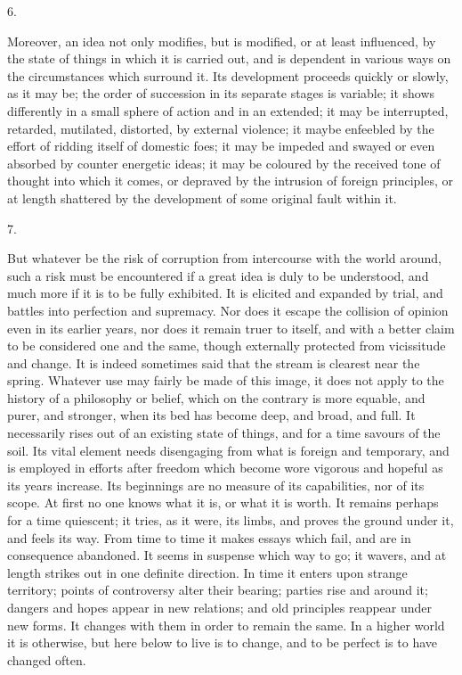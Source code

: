 6.

Moreover, an idea not only modifies, but is modified,
or at least influenced, by the state of things in which
it is carried out, and is dependent in various ways on
the circumstances which surround it. Its development
proceeds quickly or slowly, as it may be; the order of
succession in its separate stages is variable; it shows
differently in a small sphere of action and in an
extended; it may be interrupted, retarded, mutilated,
distorted, by external violence; it maybe enfeebled by
the effort of ridding itself of domestic foes; it may be
impeded and swayed or even absorbed by counter energetic
ideas; it may be coloured by the received tone of thought
into which it comes, or depraved by the intrusion of
foreign principles, or at length shattered by the
development of some original fault within it.

7.

But whatever be the risk of corruption from
intercourse with the world around, such a risk must be
encountered if a great idea is duly to be understood, and
much more if it is to be fully exhibited. It is elicited
and expanded by trial, and battles into perfection and
supremacy. Nor does it escape the collision of opinion
even in its earlier years, nor does it remain truer to
itself, and with a better claim to be considered one and
the same, though externally protected from vicissitude
and change. It is indeed sometimes said that the stream
is clearest near the spring. Whatever use may fairly be
made of this image, it does not apply to the history of a
philosophy or belief, which on the contrary is more
equable, and purer, and stronger, when its bed has become
deep, and broad, and full. It necessarily rises out of an
existing state of things, and for a time savours of the
soil. Its vital element needs disengaging from what is
foreign and temporary, and is employed in efforts after
freedom which become wore vigorous and hopeful as its
years increase. Its beginnings are no measure of its
capabilities, nor of its scope. At first no one knows
what it is, or what it is worth. It remains perhaps for a
time quiescent; it tries, as it were, its limbs, and
proves the ground under it, and feels its way. From time
to time it makes essays which fail, and are in
consequence abandoned. It seems in suspense which way to
go; it wavers, and at length strikes out in one definite
direction. In time it enters upon strange territory;
points of controversy alter their bearing; parties rise
and around it; dangers and hopes appear in new relations;
and old principles reappear under new forms. It changes
with them in order to remain the same. In a higher world
it is otherwise, but here below to live is to change, and
to be perfect is to have changed often.

